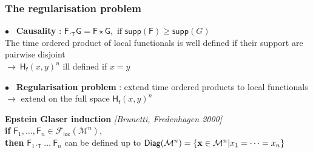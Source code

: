 \documentclass[9pt]{beamer}
\newcommand{\supp}{\mathsf{supp}} %
\newcommand{\citebeam}[1]{\textit{\textcolor{black!60!white}{[#1]}}} %
\newcommand{\Fcal}{\mathcal{F}}
\newcommand{\Mcal}{\mathcal{M}}
\newcommand{\Fsf}{\mathsf{F}}
\newcommand{\Gsf}{\mathsf{G}}
\newcommand{\Hsf}{\mathsf{H}}
\newcommand{\Tsf}{\mathsf{T}}
\newcommand{\fsf}{\mathsf{f}}
\begin{document}
\begin{frame}

\frametitle{The regularisation problem}

\vfill

$\bullet$ \ \textbf{Causality} : \quad $\Fsf ._\Tsf \Gsf = \Fsf \star \Gsf, \mbox{ if } \supp(\Fsf) \geq \supp(G)$ \\
\hspace*{8pt} The time ordered product of local functionals is well defined if their support \hspace*{8pt} are pairwise disjoint \\

\hspace*{8pt} $\to \ \Hsf_\fsf(x,y)^n$  ill defined if $x=y$ \\

\vfill 

$\bullet$ \ \textbf{Regularisation problem} : extend time ordered products to local functionals \\
\hspace*{8pt} $\to$ extend on the full space $\Hsf_\fsf(x,y)^n$

\vfill

\begin{block}{}
\vspace*{-2ex}
\textbf{Epstein Glaser induction} \citebeam{Brunetti, Fredenhagen 2000}  \\
\textbf{if} $\Fsf_1, \dots, \Fsf_n \in \Fcal_\mathsf{loc}(\Mcal^n)$, \\
\textbf{then} $\Fsf_1 ._\Tsf \ \dots \ \Fsf_n$ can be defined up to $\mathsf{Diag}(\Mcal^n)=\{{\bf x}\in \Mcal^n  | x_1 = \dots = x_n\}$ \\[5pt]
\vspace*{-1ex}
\end{block}

\vfill

\end{frame}

\end{document}

